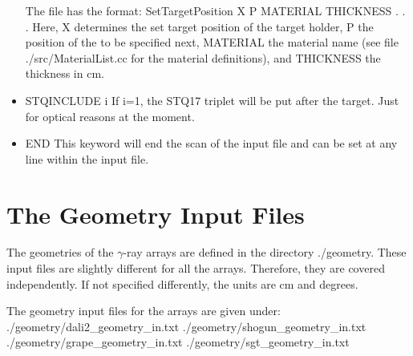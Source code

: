 \documentclass[12pt]{book}
\begin{document}
\begin{itemize}
\linebreak
 The file has the format:\hfill{}
\linebreak
\linebreak
{ SetTargetPosition X}\linebreak
{\ttfamily P MATERIAL THICKNESS\linebreak
.\linebreak
.\linebreak
.\linebreak}
\linebreak
\linebreak
Here, {\ttfamily X} determines the set target position of the target holder, {\ttfamily P} the position of the 
to be specified next, {\ttfamily MATERIAL} the material name (see file {\ttfamily ./src/MaterialList.cc} for the
material definitions), and {\ttfamily THICKNESS} the thickness in cm.
\item STQINCLUDE i\hfill{} \linebreak
  If i=1, the STQ17 triplet will be put after the target. Just for optical reasons at the moment.
\item END  \hfill{} \linebreak
  This keyword will end the scan of the input file and can be set at any line within the input file.
\end{itemize}

\section{The Geometry Input Files}
\label{Geometry}

The geometries of the $\gamma$-ray arrays are defined in the directory {\ttfamily ./geometry}.
These input files are slightly different for all the arrays. Therefore,
they are covered independently. If not specified differently, the units are cm and degrees.

The geometry input files for the arrays are given under:\hfill{} 
\linebreak
\linebreak
{\ttfamily ./geometry/dali2\_geometry\_in.txt}\linebreak
{\ttfamily ./geometry/shogun\_geometry\_in.txt}\linebreak
{\ttfamily ./geometry/grape\_geometry\_in.txt}\linebreak
{\ttfamily ./geometry/sgt\_geometry\_in.txt}\linebreak
\linebreak
\linebreak
\end{document}
